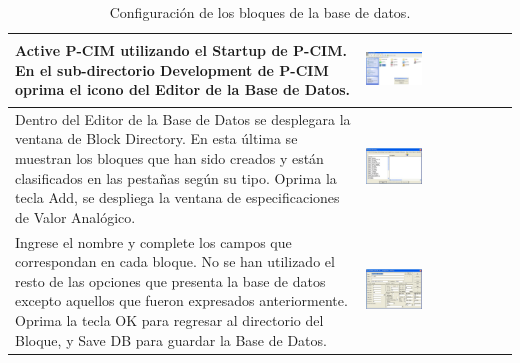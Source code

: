 \begin{table}[ht!]
\centering
\renewcommand*{\arraystretch}{0.01}
\begin{tabular}{*{2}{m{}}}
\hline
  Active P-CIM utilizando el Startup de P-CIM. En el sub-directorio Development 
  de P-CIM oprima el icono del Editor de la Base de Datos.
  &\begin{center}
    \includegraphics[width=0.4\textwidth]
      {Cap5-SCADA/images/startUp.jpeg}
  \end{center}\\
\hline
    Dentro del Editor de la Base de Datos se desplegara la ventana de Block 
    Directory. En esta última se muestran los bloques que han sido creados y
    están clasificados en las pestañas según su tipo.  Oprima la tecla Add, se 
    despliega la ventana de especificaciones de Valor Analógico.
    &\begin{center}
      \includegraphics[width=0.4\textwidth]
	{Cap5-SCADA/images/database.jpeg}
    \end{center}\\
\hline
    Ingrese el nombre y complete los campos que correspondan en cada bloque. 
    No se han utilizado el resto de las opciones que presenta la base de datos 
    excepto aquellos que fueron expresados anteriormente.
    Oprima la tecla OK para regresar al directorio del Bloque,
    y Save DB para guardar la Base de Datos.
    &\begin{center}
      \includegraphics[width=0.4\textwidth]
	{Cap5-SCADA/images/database1.jpeg}
    \end{center}\\
\hline
\end{tabular}
\caption{Configuración de los bloques de la base de datos.}
\label{tab:confBlockDB}
\end{table}

